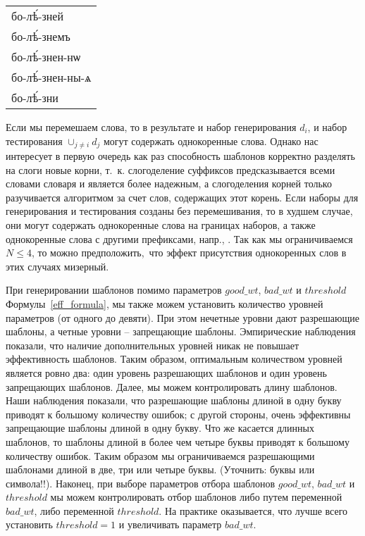 \documentclass[12pt,a4paper,oneside]{extarticle}
\begin{document}
\begin{center}
\begin{churchslavonic}
\begin{tabular}{l}
бо-лѣ́-зней \\
бо-лѣ́-знемъ \\
бо-лѣ́-знен-нѡ \\
бо-лѣ́-знен-ны-ѧ \\
бо-лѣ́-зни \\
\end{tabular}
\end{churchslavonic}
\end{center}

\noindent Если мы перемешаем слова, то в результате и набор генерирования $d_i$, и набор тестирования $\cup_{j \neq i} d_j$ могут содержать однокоренные слова. Однако нас интересует в первую очередь как раз способность шаблонов корректно разделять на слоги новые корни, т.~к. слогоделение суффиксов предсказывается всеми словами словаря и является более надежным, а слогоделения корней только разучивается алгоритмом за счет слов, содержащих этот корень. Если наборы для генерирования и тестирования созданы без перемешивания, то в худшем случае, они могут содержать однокоренные слова на границах наборов, а также однокоренные слова с другими префиксами, напр., . Так как мы ограничиваемся $N \leq 4$, то можно предположить, что эффект присутствия однокоренных слов в этих случаях мизерный.

При генерировании шаблонов помимо параметров $good\_wt$, $bad\_wt$ и $threshold$ Формулы~\ref{eff_formula}, мы также можем установить количество уровней параметров (от одного до девяти). При этом нечетные уровни дают разрешающие шаблоны, а четные уровни -- запрещающие шаблоны. Эмпирические наблюдения показали, что наличие дополнительных уровней никак не повышает эффективность шаблонов. Таким образом, оптимальным количеством уровней является ровно два: один уровень разрешающих шаблонов и один уровень запрещающих шаблонов. Далее, мы можем контролировать длину шаблонов. Наши наблюдения показали, что разрешающие шаблоны длиной в одну букву приводят к большому количеству ошибок; с другой стороны, очень эффективны запрещающие шаблоны длиной в одну букву. Что же касается длинных шаблонов, то шаблоны длиной в более чем четыре буквы приводят к большому количеству ошибок. Таким образом мы ограничиваемся разрешающими шаблонами длиной в две, три или четыре буквы. (Уточнить: буквы или символа!!). Наконец, при выборе параметров отбора шаблонов $good\_wt$, $bad\_wt$ и $threshold$ мы можем контролировать отбор шаблонов либо путем переменной $bad\_wt$, либо переменной $threshold$. На практике оказывается, что лучше всего установить $threshold = 1$ и увеличивать параметр $bad\_wt$.
\end{document}
